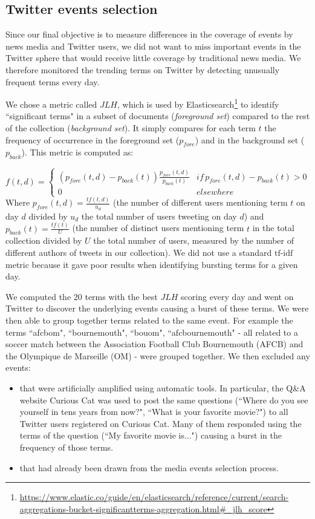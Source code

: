 \subsection{Twitter events selection}
\label{Twitter events selection}
Since our final objective is to measure differences in the coverage of events by news media and Twitter users, we did not want to miss important events in the Twitter sphere that would receive little coverage by traditional news media. We therefore monitored the trending terms on Twitter by detecting unusually frequent terms every day. 


We chose a metric called $JLH$, which is used by Elasticsearch\footnote{\url{https://www.elastic.co/guide/en/elasticsearch/reference/current/search-aggregations-bucket-significantterms-aggregation.html\#_jlh_score}}  to identify ``significant terms" in a subset of documents (\textit{foreground set}) compared to the rest of the collection (\textit{background set}). It simply compares for each term $t$ the frequency of occurrence in the foreground set ($p_{fore}$) and in the background set ($p_{back}$). This metric is computed as:

$$
f(t,d) = \left\{
	\begin{array}{ll}
		(p_{fore}(t,d) - p_{back}(t))\frac{p_{fore}(t,d)}{p_{back}(t)} & if\, p_{fore}(t,d) - p_{back}(t) > 0\\
		0 & elsewhere
	\end{array}
\right.
$$
Where $p_{fore}(t,d) = \frac{tf(t,d)}{u_d}$  (the number of different users mentioning term $t$ on day $d$ divided by $u_d$ the total number of users tweeting on day $d$) and $p_{back}(t)  = \frac{tf(t)}{U}$ (the number of distinct users mentioning term $t$ in the total collection divided by $U$  the total number of users, measured by the number of different authors of tweets in our collection). We did not use a standard $\mbox{tf-idf}$ metric because it gave poor results when identifying bursting terms for a given day.


We computed the 20 terms with the best $JLH$ scoring every day and went on Twitter to discover the underlying events causing a burst of these terms. We were then able to group together terms related to the same event. For example the terms ``afcbom", ``bournemouth", ``bouom", ``afcbournemouth" - all related to a soccer match between the Association Football Club Bournemouth (AFCB) and the Olympique de Marseille (OM) - were grouped together. We then excluded any events:
\begin{itemize}
\item that were artificially amplified using automatic tools. In particular, the Q\&A website Curious Cat was used to post the same questions (``Where do you see yourself in tens years from now?", ``What is your favorite movie?") to all Twitter users registered on Curious Cat. Many of them responded using the terms of the question (``My favorite movie is...") causing a burst in the frequency of those terms.
\item that had already been drawn from the media events selection process.
\end{itemize}

